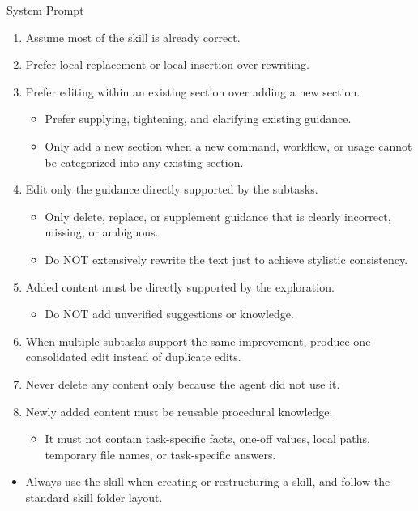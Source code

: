\begin{svpromptbox}{System Prompt}
\begin{itemize}
\end{itemize}
\smallskip
{}
\smallskip
\begin{enumerate}
\item Assume most of the skill is already correct.
\item Prefer local replacement or local insertion over rewriting.
\item Prefer editing within an existing section over adding a new section.
\begin{itemize}
\item Prefer supplying, tightening, and clarifying existing guidance.
\item Only add a new section when a new command, workflow, or usage cannot be categorized into any existing section.
\end{itemize}
\item Edit only the guidance directly supported by the subtasks.
\begin{itemize}
\item Only delete, replace, or supplement guidance that is clearly incorrect, missing, or ambiguous.
\item Do NOT extensively rewrite the text just to achieve stylistic consistency.
\end{itemize}
\item Added content must be directly supported by the exploration.
\begin{itemize}
\item Do NOT add unverified suggestions or knowledge.
\end{itemize}
\item When multiple subtasks support the same improvement, produce one consolidated edit instead of duplicate edits.
\item Never delete any content only because the agent did not use it.
\item Newly added content must be reusable procedural knowledge.
\begin{itemize}
\item It must not contain task-specific facts, one-off values, local paths, temporary file names, or task-specific answers.
\end{itemize}
\end{enumerate}
\smallskip
{}
\smallskip
\begin{itemize}
\item Always use the  skill when creating or restructuring a skill, and follow the standard skill folder layout.

\end{itemize}
\end{svpromptbox}
